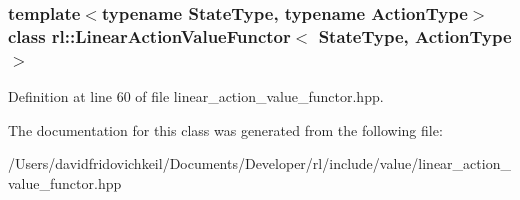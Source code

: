 \subsubsection*{template$<$typename State\+Type, typename Action\+Type$>$\newline
class rl\+::\+Linear\+Action\+Value\+Functor$<$ State\+Type, Action\+Type $>$}



Definition at line 60 of file linear\+\_\+action\+\_\+value\+\_\+functor.\+hpp.



The documentation for this class was generated from the following file\+:\begin{DoxyCompactItemize}
\item 
/\+Users/davidfridovichkeil/\+Documents/\+Developer/rl/include/value/linear\+\_\+action\+\_\+value\+\_\+functor.\+hpp\end{DoxyCompactItemize}
